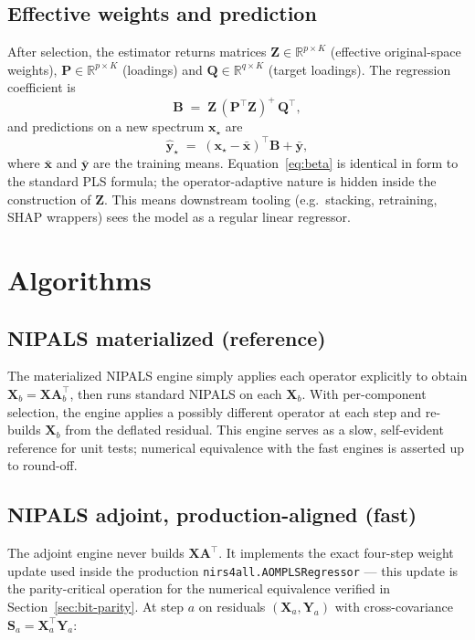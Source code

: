 \documentclass[review,a4paper]{elsarticle}
\newcommand{\R}{\mathbb{R}}
\newcommand{\Xmat}{\mathbf{X}}
\newcommand{\Ymat}{\mathbf{Y}}
\newcommand{\Pmat}{\mathbf{P}}
\newcommand{\Qmat}{\mathbf{Q}}
\newcommand{\Bmat}{\mathbf{B}}
\newcommand{\Amat}{\mathbf{A}}
\newcommand{\Smat}{\mathbf{S}}
\newcommand{\Zmat}{\mathbf{Z}}
\newcommand{\xvec}{\mathbf{x}}
\newcommand{\yvec}{\mathbf{y}}
\newcommand{\PLS}{\textsc{PLS}\xspace}
\newcommand{\NIPALS}{\textsc{NIPALS}\xspace}
\begin{document}
\subsection{Effective weights and prediction}
After selection, the estimator returns matrices
$\Zmat\in\R^{p\times K}$ (effective original-space weights),
$\Pmat\in\R^{p\times K}$ (loadings) and $\Qmat\in\R^{q\times K}$
(target loadings). The regression coefficient is
\begin{equation}
\Bmat \;=\; \Zmat\,(\Pmat^\top\Zmat)^{+}\,\Qmat^\top,
\label{eq:beta}
\end{equation}
and predictions on a new spectrum $\xvec_\star$ are
\begin{equation}
\hat{\yvec}_\star \;=\; (\xvec_\star - \bar{\xvec})^\top \Bmat
+ \bar{\yvec},
\label{eq:predict}
\end{equation}
where $\bar{\xvec}$ and $\bar{\yvec}$ are the training means.
Equation~\eqref{eq:beta} is identical in form to the standard \PLS
formula; the operator-adaptive nature is hidden inside the construction
of $\Zmat$. This means downstream tooling (e.g.\ stacking, retraining,
SHAP wrappers) sees the model as a regular linear regressor.

\section{Algorithms}\label{sec:algorithms}

\subsection{NIPALS materialized (reference)}
\label{sec:algo-nipals-mat}
The materialized \NIPALS engine simply applies each operator
explicitly to obtain $\Xmat_b=\Xmat\Amat_b^\top$, then runs standard
\NIPALS on each $\Xmat_b$. With per-component selection, the engine
applies a possibly different operator at each step and re-builds
$\Xmat_b$ from the deflated residual. This engine serves as a slow,
self-evident reference for unit tests; numerical equivalence with
the fast engines is asserted up to round-off.

\subsection{NIPALS adjoint, production-aligned (fast)}
\label{sec:algo-nipals-adj}
The adjoint engine never builds $\Xmat\Amat^\top$. It implements the
exact four-step weight update used inside the production
\verb|nirs4all.AOMPLSRegressor| --- this update is the parity-critical
operation for the numerical equivalence verified in
Section~\ref{sec:bit-parity}. At step $a$ on residuals
$(\Xmat_a,\Ymat_a)$ with cross-covariance $\Smat_a=\Xmat_a^\top\Ymat_a$:
\end{document}
